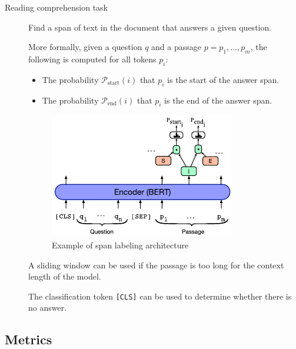 \begin{description}
    \item[Reading comprehension task] 
        Find a span of text in the document that answers a given question.

        More formally, given a question $q$ and a passage $p = p_1, \dots, p_m$, the following is computed for all tokens $p_i$:
        \begin{itemize}
            \item The probability $\mathcal{P}_\text{start}(i)$ that $p_i$ is the start of the answer span.
            \item The probability $\mathcal{P}_\text{end}(i)$ that $p_i$ is the end of the answer span.
        \end{itemize}

        \begin{figure}[H]
            \centering
            \includegraphics[width=0.4\linewidth]{./img/_qa_bert.pdf}
            \caption{Example of span labeling architecture}
        \end{figure}

        \begin{remark}
            A sliding window can be used if the passage is too long for the context length of the model.
        \end{remark}

        \begin{remark}
            The classification token \texttt{[CLS]} can be used to determine whether there is no answer.
        \end{remark}
\end{description}


\subsection{Metrics}

